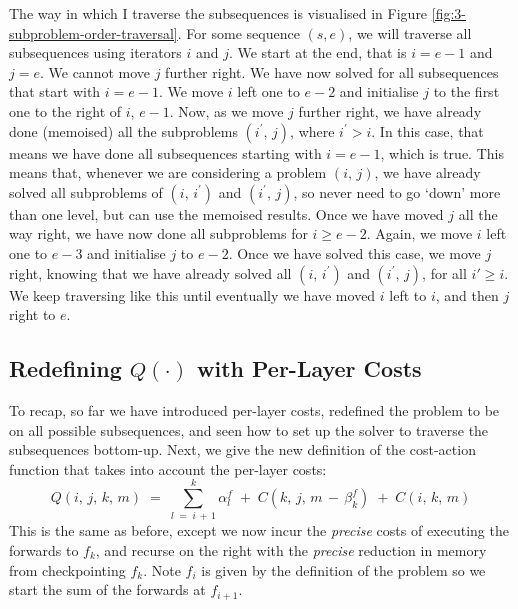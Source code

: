 The way in which I traverse the subsequences is visualised in Figure \ref{fig:3-subproblem-order-traversal}.
For some sequence \((s, e)\), we will traverse all subsequences using iterators \(i\) and \(j\).
We start at the end, that is \(i = e-1\) and \(j=e\).
We cannot move \(j\) further right.
We have now solved for all subsequences that start with \(i = e-1\).
We move \(i\) left one to \(e-2\) and initialise \(j\) to the first one to the right of \(i\), \(e-1\).
Now, as we move \(j\) further right, we have already done (memoised) all the subproblems \((i^\prime,\, j)\), where \(i^\prime > i\).
In this case, that means we have done all subsequences starting with \(i=e-1\), which is true.
This means that, whenever we are considering a problem \((i,\, j)\), we have already solved all subproblems of \((i,\, i^\prime)\) and \((i^\prime,\, j)\), so never need to go `down' more than one level, but can use the memoised results.
Once we have moved \(j\) all the way right, we have now done all subproblems for \(i \geq e-2\).
Again, we move \(i\) left one to \(e-3\) and initialise \(j\) to \(e-2\).
Once we have solved this case, we move \(j\) right, knowing that we have already solved all \((i,\, i^\prime)\) and \((i^\prime,\, j)\), for all \(i' \geq i\).
We keep traversing like this until eventually we have moved \(i\) left to \(i\), and then \(j\) right to \(e\).

\subsection{Redefining \texorpdfstring{\(Q(\cdot)\)}{\textit{Q()}} with Per-Layer Costs}
To recap, so far we have introduced per-layer costs, redefined the problem to be on all possible subsequences, and seen how to set up the solver to traverse the subsequences bottom-up.
Next, we give the new definition of the cost-action function that takes into account the per-layer costs:
\begin{equation} \label{eqn:3-Q-1}
    Q(i,\, j,\, k,\, m) \;=\; \sum_{l \;=\; i\,+\,1}^k \alpha^f_l \;+\; C(k,\, j,\, m\,-\,\beta^f_k) \;+\; C(i,\, k,\, m)
\end{equation}
This is the same as before, except we now incur the \textit{precise} costs of executing the forwards to \(f_k\), and recurse on the right with the \textit{precise} reduction in memory from checkpointing \(f_k\).
Note \(f_i\) is given by the definition of the problem so we start the sum of the forwards at \(f_{i+1}\).

